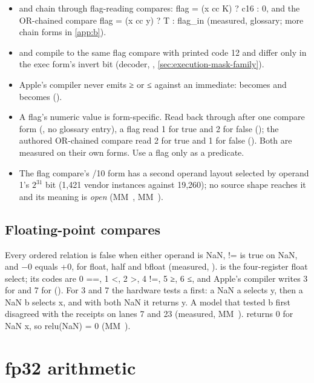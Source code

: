 \begin{itemize}
\item \code{\&\&} and \code{||} chain through flag-reading compares: 
  flag = (x cc K) ? c16 : 0, and the OR-chained compare flag = (x cc y) ? T : flag\_in (measured, glossary; more chain forms in \cref{app:b}).
\item {} and  compile to the same flag compare with printed code 12 and differ only in the exec form's
  invert bit (decoder, , \cref{sec:execution-mask-family}).
\item Apple's compiler never emits ≥ or ≤ against an immediate:  becomes  and  becomes 
  ().
\item A flag's numeric value is form-specific. Read back through  after one compare form
  (, no glossary entry), a flag read 1 for true and 2 for false (); the authored OR-chained
  compare read 2 for true and 1 for false (). Both are measured on their own forms. Use a flag only
  as a predicate.
\item The flag compare's /10 form has a second operand layout selected by operand 1's $2^{31}$ bit (1,421 vendor instances against 19,260); no
  source shape reaches it and its meaning is \emph{open} (MM~, MM~).
\end{itemize}

\subsection*{Floating-point compares}\label{sub:floating-point-compares}

Every ordered relation is false when either operand is NaN, != is true on NaN, and −0 equals +0, for float, half and
bfloat (measured, ).  is the four-register float
select; its codes are 0 ==, 1 \textless, 2 \textgreater, 4 !=, 5 ≥, 6 ≤, and Apple's compiler writes 3 for  and 7 for
 (). For 3 and 7 the hardware tests a first: a NaN a selects y, then a NaN b selects x, and with
both NaN it returns y. A model that tested b first disagreed with the receipts on lanes 7 and 23 (measured, MM~).  returns 0 for NaN x, so relu(NaN) = 0 (MM~).

\section{fp32 arithmetic}\label{sec:fp32-arithmetic}

